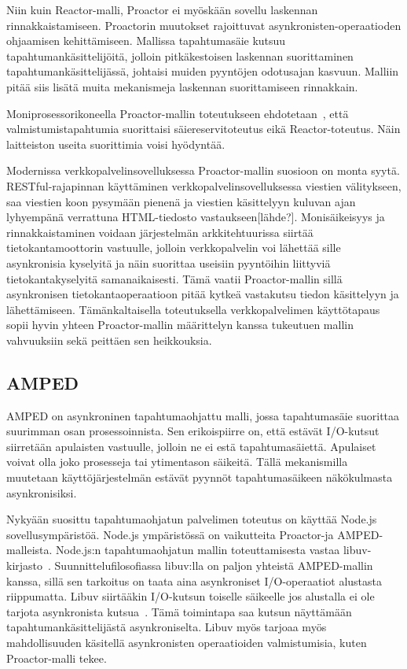 \documentclass[finnish]{tktltiki2}
\theoremstyle{definition}
\theoremstyle{remark}
\begin{document}
Niin kuin Reactor-malli, Proactor ei myöskään sovellu laskennan rinnakkaistamiseen.
Proactorin muutokset rajoittuvat asynkronisten-operaatioden ohjaamisen
kehittämiseen. Mallissa tapahtumasäie kutsuu tapahtumankäsittelijöitä, jolloin
pitkäkestoisen laskennan suorittaminen tapahtumankäsittelijässä, johtaisi
muiden pyyntöjen odotusajan kasvuun. Malliin pitää siis
lisätä muita mekanismeja laskennan suorittamiseen rinnakkain.

Moniprosessorikoneella Proactor-mallin toteutukseen
ehdotetaan~\cite{pyarali_proactor_1997}, että valmistumistapahtumia suorittaisi säiereservitoteutus
eikä Reactor-toteutus. Näin laitteiston useita suorittimia voisi hyödyntää.

Modernissa verkkopalvelinsovelluksessa Proactor-mallin suosioon on
monta syytä. RESTful-rajapinnan käyttäminen
verkkopalvelinsovelluksessa viestien välitykseen,
saa viestien koon pysymään pienenä ja viestien
käsittelyyn kuluvan ajan lyhyempänä verrattuna
HTML-tiedosto vastaukseen[lähde?]. %
Monisäikeisyys ja rinnakkaistaminen
voidaan järjestelmän arkkitehtuurissa siirtää tietokantamoottorin vastuulle,
jolloin verkkopalvelin voi lähettää sille asynkronisia kyselyitä
ja näin suorittaa useisiin pyyntöihin liittyviä tietokantakyselyitä
samanaikaisesti. Tämä vaatii Proactor-mallin sillä asynkronisen tietokantaoperaatioon
pitää kytkeä vastakutsu tiedon käsittelyyn ja lähettämiseen.
Tämänkaltaisella toteutuksella verkkopalvelimen käyttötapaus sopii
hyvin yhteen Proactor-mallin määrittelyn kanssa tukeutuen
mallin vahvuuksiin sekä peittäen sen heikkouksia.

\subsection{AMPED}

AMPED on asynkroninen tapahtumaohjattu malli, jossa
tapahtumasäie suorittaa suurimman osan prosessoinnista. 
Sen erikoispiirre on, että estävät I/O-kutsut
siirretään apulaisten vastuulle, jolloin
ne ei estä tapahtumasäiettä. Apulaiset voivat
olla joko prosesseja tai ytimentason säikeitä.
Tällä mekanismilla muutetaan käyttöjärjestelmän
estävät pyynnöt tapahtumasäikeen näkökulmasta
asynkronisiksi.

Nykyään suosittu tapahtumaohjatun palvelimen toteutus on
käyttää Node.js sovellusympäristöä. Node.js ympäristössä
on vaikutteita Proactor-ja AMPED-malleista.
Node.js:n tapahtumaohjatun mallin toteuttamisesta vastaa
libuv-kirjasto~\cite{libuv_design_2019}. Suunnittelufilosofiassa
libuv:lla on paljon yhteistä AMPED-mallin kanssa, sillä
sen tarkoitus on taata aina asynkroniset I/O-operaatiot alustasta
riippumatta. Libuv siirtääkin I/O-kutsun toiselle säikeelle
jos alustalla ei ole tarjota asynkronista kutsua~\cite{libuv_design_2019}.
Tämä toimintapa saa kutsun näyttämään tapahtumankäsittelijästä
asynkroniselta. Libuv myös tarjoaa myös mahdollisuuden
käsitellä asynkronisten operaatioiden valmistumisia, kuten 
Proactor-malli tekee.
\end{document}

